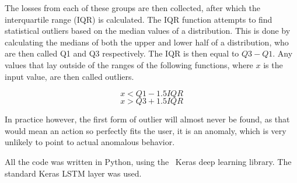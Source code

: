 The losses from each of these groups are then collected, after which the interquartile range (IQR) is calculated. The IQR function attempts to find statistical outliers based on the median values of a distribution. This is done by calculating the medians of both the upper and lower half of a distribution, who are then called Q1 and Q3 respectively. The IQR is then equal to $Q3 - Q1$. Any values that lay outside of the ranges of the following functions, where $x$ is the input value, are then called outliers.

$$ x < Q1 - 1.5 IQR $$
$$ x > Q3 + 1.5 IQR $$

In practice however, the first form of outlier will almost never be found, as that would mean an action so perfectly fits the user, it is an anomaly, which is very unlikely to point to actual anomalous behavior.

All the code was written in Python, using the~\cite{chollet2015keras} Keras deep learning library. The standard Keras LSTM layer was used.